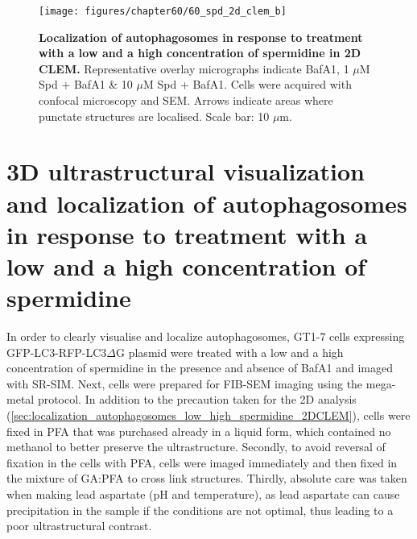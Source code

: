\begin{landscape}
\begin{figure}[!htbp]
\centering
 \texttt{[image: figures/chapter60/60\_spd\_2d\_clem\_b]}
 \caption[Localization of autophagosomes in response to treatment with a low and a high concentration of spermidine in 2D CLEM]{\textbf{Localization of autophagosomes in response to treatment with a low and a high concentration of spermidine in 2D CLEM.} Representative overlay micrographs indicate BafA1, 1 $\mu$M Spd + BafA1 \& 10 $\mu$M Spd + BafA1. Cells were acquired with confocal microscopy and SEM. Arrows indicate areas where punctate structures are localised. Scale bar: 10 $\mu$m.}
 \label{fig:60_spd_2d_clem_b}
\end{figure} 
\end{landscape}

\section{3D ultrastructural visualization and localization of autophagosomes in response to treatment with a low and a high concentration of spermidine}
In order to clearly visualise and localize autophagosomes, GT1-7 cells expressing GFP-LC3-RFP-LC3$\Delta$G plasmid were treated with a low and a high concentration of spermidine in the presence and absence of BafA1 and imaged with SR-SIM. Next, cells were prepared for FIB-SEM imaging using the mega-metal protocol. In addition to the precaution taken for the 2D analysis (\cref{sec:localization_autophagosomes_low_high_spermidine_2DCLEM}), cells were fixed in PFA that was purchased already in a liquid form, which contained no methanol to better preserve the ultrastructure. Secondly, to avoid reversal of fixation in the cells with PFA, cells were imaged immediately and then fixed in the mixture of GA:PFA to cross link structures. Thirdly, absolute care was taken when making lead aspartate (pH and temperature), as lead aspartate can cause precipitation in the sample if the conditions are not optimal, thus leading to a poor ultrastructural contrast.

